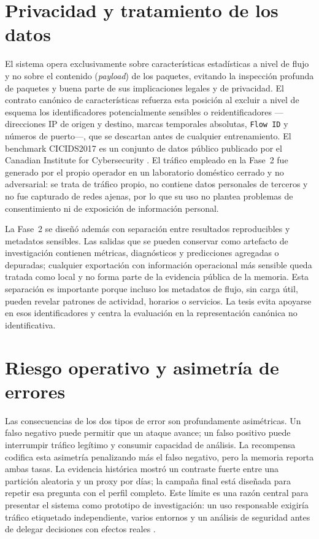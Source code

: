 \section{Privacidad y tratamiento de los datos}
El sistema opera exclusivamente sobre características estadísticas a nivel de flujo y no sobre el contenido (\emph{payload}) de los paquetes, evitando la inspección profunda de paquetes y buena parte de sus implicaciones legales y de privacidad. El contrato canónico de características refuerza esta posición al excluir a nivel de esquema los identificadores potencialmente sensibles o reidentificadores —direcciones IP de origen y destino, marcas temporales absolutas, \texttt{Flow ID} y números de puerto—, que se descartan antes de cualquier entrenamiento. El benchmark CICIDS2017 es un conjunto de datos público publicado por el Canadian Institute for Cybersecurity \parencite{Sharafaldin2018CICIDS2017,CICIDS2017Web}. El tráfico empleado en la Fase~2 fue generado por el propio operador en un laboratorio doméstico cerrado y no adversarial: se trata de tráfico propio, no contiene datos personales de terceros y no fue capturado de redes ajenas, por lo que su uso no plantea problemas de consentimiento ni de exposición de información personal.

La Fase~2 se diseñó además con separación entre resultados reproducibles y metadatos sensibles. Las salidas que se pueden conservar como artefacto de investigación contienen métricas, diagnósticos y predicciones agregadas o depuradas; cualquier exportación con información operacional más sensible queda tratada como local y no forma parte de la evidencia pública de la memoria. Esta separación es importante porque incluso los metadatos de flujo, sin carga útil, pueden revelar patrones de actividad, horarios o servicios. La tesis evita apoyarse en esos identificadores y centra la evaluación en la representación canónica no identificativa.

\section{Riesgo operativo y asimetría de errores}
Las consecuencias de los dos tipos de error son profundamente asimétricas. Un falso negativo puede permitir que un ataque avance; un falso positivo puede interrumpir tráfico legítimo y consumir capacidad de análisis. La recompensa codifica esta asimetría penalizando más el falso negativo, pero la memoria reporta ambas tasas. La evidencia histórica mostró un contraste fuerte entre una partición aleatoria y un proxy por días; la campaña final está diseñada para repetir esa pregunta con el perfil completo. Este límite es una razón central para presentar el sistema como prototipo de investigación: un uso responsable exigiría tráfico etiquetado independiente, varios entornos y un análisis de seguridad antes de delegar decisiones con efectos reales \parencite{Apruzzese2022CrossEvaluationNIDS,SommerPaxson2010ClosedWorld}.

